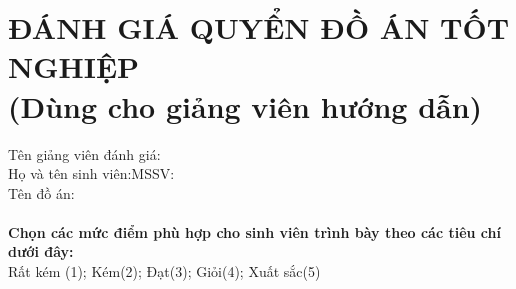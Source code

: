 \section*{ĐÁNH GIÁ QUYỂN ĐỒ ÁN TỐT NGHIỆP\\\fontsize{14pt}{0pt}\selectfont \vspace{4pt}\textnormal{(Dùng cho giảng viên hướng dẫn)}}
\thispagestyle{empty}
\vspace{-16pt}
\hspace{-1cm}Tên giảng viên đánh giá:\dotfill\\
Họ và tên sinh viên:\dotfill MSSV:\dotfill\\
Tên đồ án:\dotfill\\
\\
\textbf{Chọn các mức điểm phù hợp cho sinh viên trình bày theo các tiêu chí dưới đây:}\\
Rất kém (1); Kém(2); Đạt(3); Giỏi(4); Xuất sắc(5)

